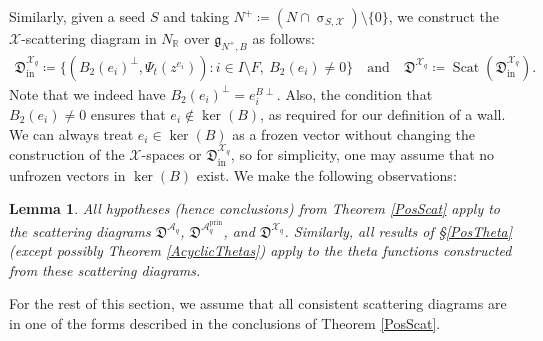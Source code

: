 \documentclass{amsart}
\DeclareMathOperator{\prin}{prin}
\DeclareMathOperator{\In}{in}
\DeclareMathOperator{\scat}{Scat}
\let\bb=\mathbb
\let\f=\mathfrak
\let\s=\mathcal
\renewcommand{\sigma}{\upsigma}
\theoremstyle{plain}%
\newtheorem{lem}[thm]{Lemma}
\theoremstyle{definition}
\theoremstyle{remark}
\begin{document}
Similarly, given a seed $S$ and taking $N^+\coloneqq (N\cap \sigma_{S,\s{X}})\setminus \{0\}$, we construct the $\s{X}$-scattering diagram in $N_{\bb{R}}$ over $\f{g}_{N^+,B}$ as follows:
\begin{align*}
    \f{D}^{\s{X}_q}_{\In}\coloneqq \{(B_2(e_i)^{\perp},\Psi_t(z^{e_i}))\colon i\in I\setminus F, ~B_2(e_i)\neq 0\} \quad \mbox{and} \quad \f{D}^{\s{X}_q}\coloneqq  \scat(\f{D}^{\s{X}_q}_{\In}).
\end{align*}
Note that we indeed have $B_2(e_i)^{\perp} = e_i^{B\perp}$.  Also, the condition that $B_2(e_i)\neq 0$ ensures that $e_i\notin \ker(B)$, as required for our definition of a wall.  We can always treat $e_i\in \ker(B)$ as a frozen vector without changing the construction of the $\s{X}$-spaces or $\f{D}^{\s{X}_q}_{\In}$, so for simplicity, one may assume that no unfrozen vectors in $\ker(B)$ exist.   We make the following observations:


\begin{lem}\label{cluster-scat-pos}
All hypotheses (hence conclusions) from Theorem \ref{PosScat} apply to the scattering diagrams $\f{D}^{\s{A}_q}$, $\f{D}^{\s{A}_q^{\prin}}$, and $\f{D}^{\s{X}_q}$.  Similarly, all results of \S \ref{PosTheta} (except possibly Theorem \ref{AcyclicThetas}) apply to the theta functions constructed from these scattering diagrams.
\end{lem}




For the rest of this section, we assume that all consistent scattering diagrams are in one of the forms described in the conclusions of Theorem \ref{PosScat}.
\end{document}
